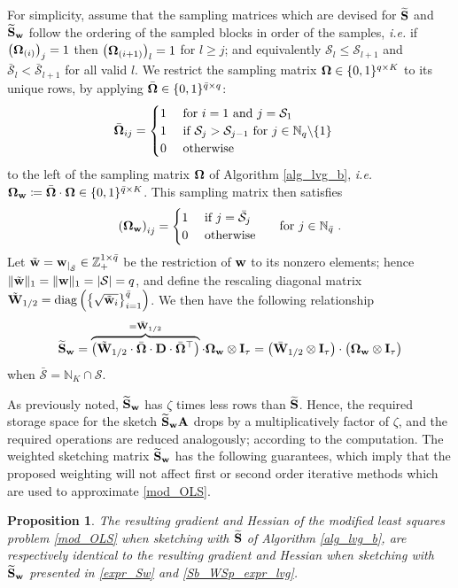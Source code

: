 \documentclass[journal,letterpaper,onecolumn,twoside,nofonttune]{IEEEtran}
\newcommand{\N}{\mathbb{N}}
\newcommand{\Z}{\mathbb{Z}}
\newcommand{\Scal}{\mathcal{S}}
\newcommand{\Sbar}{\bar{\mathcal{S}}}
\newcommand{\qbar}{\bar{q}}
\newcommand{\Ab}{\bold{A}}
\newcommand{\Db}{\bold{D}}
\newcommand{\Ib}{\bold{I}}
\newcommand{\Sb}{\bold{S}}
\newcommand{\Sbwt}{\widetilde{\Sb}}
\newcommand{\Sbw}{\Sbwt_{\wb}}
\newcommand{\wb}{\bold{w}}
\newcommand{\Wb}{\bold{W}}
\newcommand{\Wbb}{\bar{\bold{W}}}
\newcommand{\Omb}{\bold{\Omega}}
\newcommand{\Ombb}{\bar{\bold{\Omega}}}
\newcommand{\Ombw}{\Omb_{\wb}}
\newcommand{\wbt}{\tilde{\wb}}
\newcommand{\Wbt}{\tilde{\Wb}}
\newcommand{\diag}{\mathrm{diag}}
\newtheorem{Prop}{Proposition}
\begin{document}
For simplicity, assume that the sampling matrices which are devised for $\Sbwt$ and $\Sbw$ follow the ordering of the sampled blocks in order of the samples, \textit{i.e.} if $\left(\Omb_{(i)}\right)_j=1$ then $\left(\Omb_{(i+1)}\right)_l=1$ for $l\geqslant j$; and equivalently $\Scal_l\leqslant\Scal_{l+1}$ and $\Sbar_l<\Sbar_{l+1}$ for all valid $l$. We restrict the sampling matrix $\Omb\in\{0,1\}^{q\times K}$ to its unique rows, by applying $\Ombb\in\{0,1\}^{\qbar\times q}$:
$$ \Ombb_{ij} = \begin{cases} 1 \quad \text{ for } i=1 \text{ and } j=\Scal_1 \\ 1 \quad \text{ if } \Scal_j>\Scal_{j-1} \text{ for } j\in\N_q\backslash\{1\} \\ 0 \quad \text{ otherwise } \end{cases} $$
to the left of the sampling matrix $\Omb$ of Algorithm \ref{alg_lvg_b}, \textit{i.e.} $\Ombw \coloneqq \Ombb\cdot\Omb\in\{0,1\}^{\qbar\times K}$. This sampling matrix then satisfies
$$ \left(\Ombw\right)_{ij} = \begin{cases} 1 \quad \text{ if } j=\Sbar_j \\ 0 \quad \text{ otherwise } \end{cases} \text{ for } j\in\N_{\qbar}\ . $$
Let $\wbt=\wb_{|_{\Sbar}}\in\Z_+^{1\times \qbar}$ be the restriction of $\wb$ to its nonzero elements; hence $\|\wbt\|_1=\|\wb\|_1=|\Scal|=q$, and define the rescaling diagonal matrix $\Wbt_{1/2}=\diag\left(\big\{\sqrt{\wbt_i}\big\}_{i=1}^{\qbar}\right)$. We then have the following relationship
\begin{equation}
\label{Sb_WSp_expr_lvg}
  \Sbw = \overbrace{\left(\Wbt_{1/2}\cdot\Ombb\cdot\Db\cdot\Ombb^\top\right)}^{=\Wbb_{1/2}}\cdot\Ombw\otimes\Ib_{\tau} = \big(\Wbb_{1/2}\otimes\Ib_\tau\big)\cdot\big(\Ombw\otimes\Ib_\tau\big)
\end{equation}
when $\Sbar=\N_K\cap\Scal$.

As previously noted, $\Sbw$ has $\zeta$ times less rows than $\Sbwt$. Hence, the required storage space for the sketch $\Sbw\Ab$ drops by a multiplicatively factor of $\zeta$, and the required operations are reduced analogously; according to the computation. The weighted sketching matrix $\Sbw$ has the following guarantees, which imply that the proposed weighting will not affect first or second order iterative methods which are used to approximate \eqref{mod_OLS}.

\begin{Prop}
\label{prop_wght_lr}  %
The resulting gradient and Hessian of the modified least squares problem \eqref{mod_OLS} when sketching with $\Sbwt$ of Algorithm \ref{alg_lvg_b}, are respectively identical to the resulting gradient and Hessian when sketching with $\Sbw$ presented in \eqref{expr_Sw} and \eqref{Sb_WSp_expr_lvg}.
\end{Prop}
\end{document}
